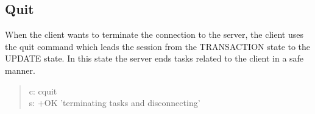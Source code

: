 \documentclass[a4paper,11pt]{article}
\begin{document}
\subsection{Quit}
When the client wants to terminate the connection to the server, the client uses the quit command which leads the session from the TRANSACTION state to the UPDATE state. In this state the server ends tasks related to the client in a safe manner.

\begin{quote}
  c: cquit\\
  s: +OK 'terminating tasks and disconnecting'
\end{quote}
\end{document}
